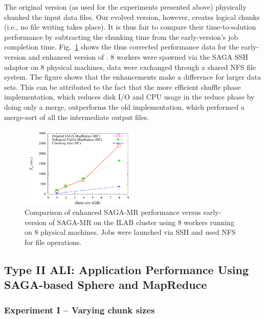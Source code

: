 \documentclass[3p,twocolumn]{elsarticle}
\begin{document}
The original \sagamapreduce version (as used for the experiments
presented above) physically chunked the input data files.  Our evolved
version, however, creates logical chunks (i.e., no file
writing takes place).  It is thus fair to compare their
time-to-solution performance by subtracting the chunking time from the
early-version's job completion time.  Fig.~\ref{fig:sagamr_comparison}
shows the thus corrected performance data for the early-version and
enhanced version of \sagamapreduce.  8 workers were spawned via the
SAGA SSH adaptor on 8 physical machines,  data were exchanged through
a shared NFS file system.  The figure shows that the \sagamapreduce
enhancements make a difference for larger data sets.  This can be
attributed to the fact that the more efficient shuffle phase
implementation, which reduces disk I/O and CPU usage in the reduce
phase by doing only a merge, outperforms the old implementation, which
performed a merge-sort of all the intermediate output files.

\begin{figure}[htb!]
 \includegraphics[width=0.5\textwidth]{figures/sagamr_comparison.pdf}
 \caption{
   Comparison of enhanced SAGA-MR performance versus
   early-version of SAGA-MR on the ILAB cluster using 8 workers running on 8
   physical machines. Jobs were launched via SSH and used NFS for file
   operations.
   \label{fig:sagamr_comparison}
   }
\end{figure}

\subsection{Type II ALI: Application Performance Using SAGA-based
Sphere and MapReduce}

\subsubsection{Experiment I -- Varying chunk sizes} 
\end{document}
